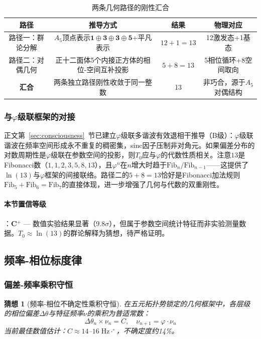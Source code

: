 \documentclass[12pt,a4paper,twocolumn]{article}
\renewcommand{\phi}{\varphi}
\newtheorem{conjecture}[theorem]{猜想}
\begin{document}
\begin{table}[H]
\centering
\footnotesize
\caption{两条几何路径的刚性汇合}
\label{tab:dual_paths_13}
\begin{tabular}{c|c|c|c}
\hline
\textbf{路径} & \textbf{推导方式} & \textbf{结果} & \textbf{物理对应} \\
\hline
路径一：群论分解 & $A_5$顶点表示$\mathbf{1}\oplus\mathbf{3}\oplus\mathbf{3}\oplus\mathbf{5}$+平凡表示 & $12+1=13$ & 12激发态+1基态 \\
路径二：对偶几何 & 正十二面体5个内接正方体的相位-空间互补投影 & $5+8=13$ & 5相位循环+8空间取向 \\
\hline
\textbf{汇合} & 两条独立路径刚性收敛于同一整数 & 13 & 非巧合，源于$A_5$对偶结构 \\
\hline
\end{tabular}
\end{table}

\subsubsection{与$\phi$级联框架的对接}

正文第~\ref{sec:consciousness}~节已建立$\phi$级联多谐波有效退相干推导（B级）：$\phi$级联谐波在频率空间形成永不重复的稠密集，sinc因子压制非对角元。如果偏差分布的对数周期性是$\phi$级联在参数空间的投影，则$T_0$应与$\phi$的代数性质相关。注意$13$是Fibonacci数（$1,1,2,3,5,8,13$），且$\phi^n$在$n$增大时趋于$\text{Fib}_n/\text{Fib}_{n-1}$——这提供了$\ln(13)$与$\phi$框架的间接联络。路径二的$5+8=13$恰好是Fibonacci加法规则$\text{Fib}_5+\text{Fib}_6=\text{Fib}_7$的直接体现，进一步增强了几何与代数的双重刚性。

\paragraph{本节置信等级}：\textbf{C$^+$} --- 数值实验结果显著（9.8$\sigma$），但属于参数空间统计特征而非实验测量数据。$T_0 \approx \ln(13)$的群论解释为猜想，待严格证明。

\subsection{频率-相位标度律}
\label{subsec:freq_phase}

\subsubsection{偏差-频率乘积守恒}

\begin{conjecture}[频率-相位不确定性乘积守恒]
\label{conj:product_conservation}
在五元拓扑势锁定的几何框架中，各层级的相位偏差$\Delta\theta$与特征频率$\nu$的乘积为普适常数：
\begin{equation}
\Delta\theta_n \times \nu_n = C, \quad \nu_{n+1} = \phi \cdot \nu_n
\label{eq:product_conservation}
\end{equation}
当前最佳数值估计：$C \approx 14$--$16\;\text{Hz}\cdot^\circ$，不确定度约14\%。
\end{conjecture}
\end{document}
